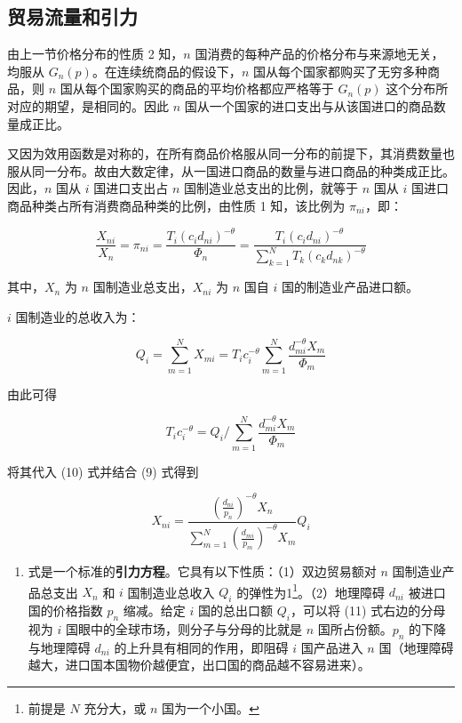 \documentclass[
]{article}
\providecommand{\tightlist}{%
  \setlength{\itemsep}{0pt}\setlength{\parskip}{0pt}}
\begin{document}
\hypertarget{ux8d38ux6613ux6d41ux91cfux548cux5f15ux529b}{%
\subsection{贸易流量和引力}\label{ux8d38ux6613ux6d41ux91cfux548cux5f15ux529b}}

由上一节价格分布的性质 2 知，\(n\) 国消费的每种产品的价格分布与来源地无关，均服从
\(G_n(p)\)。在连续统商品的假设下，\(n\) 国从每个国家都购买了无穷多种商品，则 \(n\)
国从每个国家购买的商品的平均价格都应严格等于 \(G_n(p)\)
这个分布所对应的期望，是相同的。因此 \(n\)
国从一个国家的进口支出与从该国进口的商品数量成正比。

又因为效用函数是对称的，在所有商品价格服从同一分布的前提下，其消费数量也服从同一分布。故由大数定律，从一国进口商品的数量与进口商品的种类成正比。因此，\(n\)
国从 \(i\) 国进口支出占 \(n\) 国制造业总支出的比例，就等于 \(n\) 国从 \(i\)
国进口商品种类占所有消费商品种类的比例，由性质 1 知，该比例为 \(\pi_{ni}\)，即：

\[
\frac{X_{n i}}{X_{n}}=\pi_{ni}=\frac{T_{i}\left(c_{i} d_{n i}\right)^{-\theta}}{\Phi_{n}}=\frac{T_{i}\left(c_{i} d_{n i}\right)^{-\theta}}{\sum_{k=1}^{N} T_{k}\left(c_{k} d_{n k}\right)^{-\theta}}  \tag{10}
\]

其中，\(X_{n}\) 为 \(n\) 国制造业总支出，\(X_{n i}\) 为 \(n\) 国自 \(i\) 国的制造业产品进口额。

\(i\) 国制造业的总收入为：

\[
Q_{i}=\sum_{m=1}^{N} X_{m i}=T_{i} c_{i}^{-\theta} \sum_{m=1}^{N} \frac{d_{m i}^{-\theta} X_{m}}{\Phi_{m}}
\]

由此可得

\[
T_{i} c_{i}^{-\theta}=Q_i/\sum_{m=1}^{N} \frac{d_{m i}^{-\theta} X_{m}}{\Phi_{m}}
\]

将其代入 (10) 式并结合 (9) 式得到

\[
X_{n i}=\frac{\left(\frac{d_{n i}}{p_{n}}\right)^{-\theta} X_{n}}{\sum_{m=1}^{N}\left(\frac{d_{m i}}{p_{m}}\right)^{-\theta} X_{m}} Q_{i} \tag{11}
\]

\begin{enumerate}
\def\labelenumi{(\arabic{enumi})}
\setcounter{enumi}{10}
\tightlist
\item
  式是一个标准的\textbf{引力方程}。它具有以下性质：（1）双边贸易额对 \(n\) 国制造业产品总支出 \(X_n\) 和 \(i\) 国制造业总收入 \(Q_i\) 的弹性为1\footnote{前提是 \(N\) 充分大，或 \(n\) 国为一个小国。}。（2）地理障碍 \(d_{ni}\) 被进口国的价格指数 \(p_n\)
  缩减。给定 \(i\) 国的总出口额 \(Q_i\)，可以将 (11) 式右边的分母视为 \(i\) 国眼中的全球市场，则分子与分母的比就是 \(n\) 国所占份额。\(p_n\)
  的下降与地理障碍 \(d_{ni}\) 的上升具有相同的作用，即阻碍 \(i\) 国产品进入 \(n\)
  国（地理障碍越大，进口国本国物价越便宜，出口国的商品越不容易进来）。
\end{enumerate}
\end{document}
